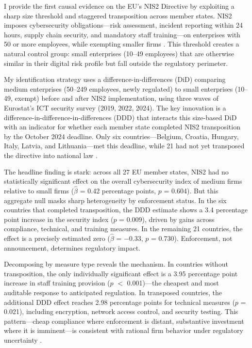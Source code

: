 \documentclass[12pt]{article}
\begin{document}
I provide the first causal evidence on the EU's NIS2 Directive by exploiting a sharp size threshold and staggered transposition across member states. NIS2 imposes cybersecurity obligations---risk assessment, incident reporting within 24 hours, supply chain security, and mandatory staff training---on enterprises with 50 or more employees, while exempting smaller firms \citep{eu2022nis2}. This threshold creates a natural control group: small enterprises (10--49 employees) that are otherwise similar in their digital risk profile but fall outside the regulatory perimeter.

My identification strategy uses a difference-in-differences (DiD) comparing medium enterprises (50--249 employees, newly regulated) to small enterprises (10--49, exempt) before and after NIS2 implementation, using three waves of Eurostat's ICT security survey (2019, 2022, 2024). The key innovation is a difference-in-difference-in-differences (DDD) that interacts this size-based DiD with an indicator for whether each member state completed NIS2 transposition by the October 2024 deadline. Only six countries---Belgium, Croatia, Hungary, Italy, Latvia, and Lithuania---met this deadline, while 21 had not yet transposed the directive into national law \citep{ecNIS2tracker}.

The headline finding is stark: across all 27 EU member states, NIS2 had no statistically significant effect on the overall cybersecurity index of medium firms relative to small firms ($\hat{\beta}$ = 0.42 percentage points, $p$ = 0.604). But this aggregate null masks sharp heterogeneity by enforcement status. In the six countries that completed transposition, the DDD estimate shows a 3.4 percentage point increase in the security index ($p$ = 0.009), driven by gains across compliance, technical, and training measures. In the remaining 21 countries, the effect is a precisely estimated zero ($\hat{\beta}$ = $-$0.33, $p$ = 0.730). Enforcement, not announcement, determines regulatory impact.

Decomposing by measure type reveals the mechanism. In countries without transposition, the only individually significant effect is a 3.95 percentage point increase in staff training provision ($p$ $<$ 0.001)---the cheapest and most auditable response to anticipated regulation. In transposed countries, the additional DDD effect reaches 2.98 percentage points for technical measures ($p$ = 0.021), including encryption, network access control, and security testing. This pattern---cheap compliance where enforcement is distant, substantive investment where it is imminent---is consistent with rational firm behavior under regulatory uncertainty \citep{stigler1971regulation, shimshack2014enforcement}.
\end{document}
